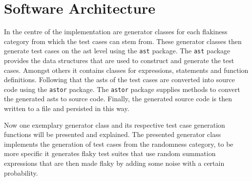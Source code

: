 \documentclass[
fancyheadings, %
%
%
]{stsreprt}
\begin{document}
\section{Software Architecture}
In the centre of the implementation are generator classes for each flakiness category from which the test cases can stem from. 
These generator classes then generate test cases on the \acrshort{ast} level using the \texttt{ast} package.
The \texttt{ast} package provides the data structures that are used to construct and generate the test cases. 
Amongst others it contains classes for expressions, statements and function definitions.
Following that the \acrshort{ast}s of the test cases are converted into source code using the \texttt{astor} package. 
The \texttt{astor} package supplies methods to convert the generated \acrshort{ast}s to source code. 
Finally, the generated source code is then written to a file and persisted in this way.\par
Now one exemplary generator class and its respective test case generation functions will be presented and explained.
The presented generator class implements the generation of test cases from the randomness category, to be more specific it generates flaky test suites that use random summation expressions that are then made flaky by adding some noise with a certain probability.
\end{document}
